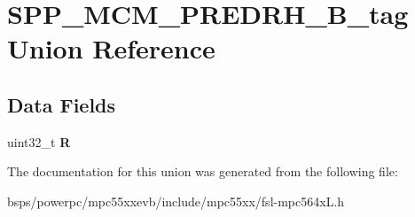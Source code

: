 \hypertarget{unionSPP__MCM__PREDRH__32B__tag}{}\section{S\+P\+P\+\_\+\+M\+C\+M\+\_\+\+P\+R\+E\+D\+R\+H\+\_\+B\+\_\+tag Union Reference}
\label{unionSPP__MCM__PREDRH__32B__tag}
\subsection*{Data Fields}
\begin{DoxyCompactItemize}
\item 
\mbox{\label{unionSPP__MCM__PREDRH__32B__tag_a89675796014017d9232fe3ae8e8a8e28}} 
uint32\+\_\+t {\bfseries R}
\end{DoxyCompactItemize}


The documentation for this union was generated from the following file\+:\begin{DoxyCompactItemize}
\item 
bsps/powerpc/mpc55xxevb/include/mpc55xx/fsl-\/mpc564x\+L.\+h\end{DoxyCompactItemize}
